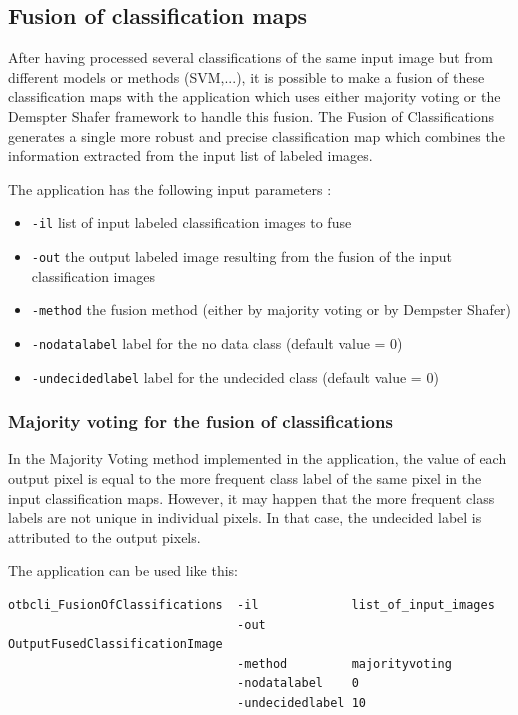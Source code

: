 \subsection{Fusion of classification maps}\label{ssec:fusionofclassifications}

After having processed several classifications of the same input image but from 
different models or methods (SVM,...), it is possible to make a fusion of these 
classification maps with the  application 
which uses either majority voting or the Demspter Shafer framework to handle this 
fusion. The Fusion of Classifications generates a single more robust and precise 
classification map which combines the information extracted from the input list of 
labeled images.

The  application has the following input parameters :
\begin{itemize}
\item \verb?-il? list of input labeled classification images to fuse
\item \verb?-out? the output labeled image resulting from the fusion of the input classification images
\item \verb?-method? the fusion method (either by majority voting or by Dempster Shafer)
\item \verb?-nodatalabel? label for the no data class (default value = 0)
\item \verb?-undecidedlabel? label for the undecided class (default value = 0)
\end{itemize}

\subsubsection{Majority voting for the fusion of classifications}

In the Majority Voting method implemented in the  
application, the value of each output pixel is equal to the more frequent class 
label of the same pixel in the input classification maps. However, it may happen 
that the more frequent class labels are not unique in individual pixels. In that 
case, the undecided label is attributed to the output pixels.


The application can be used like this:
\begin{verbatim}
otbcli_FusionOfClassifications  -il             list_of_input_images
                                -out            OutputFusedClassificationImage
                                -method         majorityvoting
                                -nodatalabel    0
                                -undecidedlabel 10
\end{verbatim}


